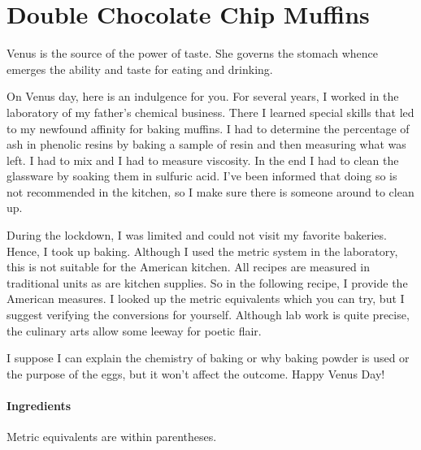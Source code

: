 \section{Double Chocolate Chip Muffins}

\begin{quotex}
Venus is the source of the power of taste. She governs the stomach whence emerges the ability and taste for eating and drinking.
\end{quotex}

On Venus day, here is an indulgence for you. For several years, I worked in the laboratory of my father's chemical business. There I learned special skills that led to my newfound affinity for baking muffins. I had to determine the percentage of ash in phenolic resins by baking a sample of resin and then measuring what was left. I had to mix and I had to measure viscosity. In the end I had to clean the glassware by soaking them in sulfuric acid. I've been informed that doing so is not recommended in the kitchen, so I make sure there is someone around to clean up.

During the lockdown, I was limited and could not visit my favorite bakeries. Hence, I took up baking. Although I used the metric system in the laboratory, this is not suitable for the American kitchen. All recipes are measured in traditional units as are kitchen supplies. So in the following recipe, I provide the American measures. I looked up the metric equivalents which you can try, but I suggest verifying the conversions for yourself. Although lab work is quite precise, the culinary arts allow some leeway for poetic flair.

I suppose I can explain the chemistry of baking or why baking powder is used or the purpose of the eggs, but it won't affect the outcome. Happy Venus Day!

\paragraph{Ingredients}

Metric equivalents are within parentheses.

